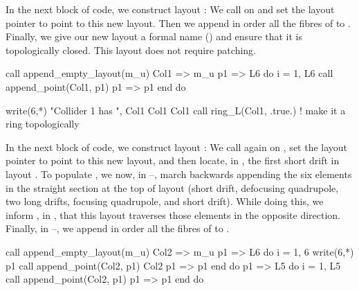 %
In the next block of code, we construct layout : We
call  on  and set the layout
pointer  to point to this new layout. Then we append
in order all the fibres of  to . Finally, we
give our new layout a formal name () and ensure
that it is topologically closed. This layout does not require
patching.
%
\begin{ptccode}
call append_empty_layout(m_u)
Col1 => m_u%
p1 => L6%
do i = 1, L6%
  call append_point(Col1, p1)
  p1 => p1%
end do

write(6,*) "Collider 1 has ", Col1%
Col1%
Col1%
call ring_L(Col1, .true.) ! make it a ring topologically
\end{ptccode}

In the next block of code, we construct layout : We call
 again on , set the layout
pointer  to point to this new layout, and then locate,
in , the first short drift in layout .
To populate , we now, in
--, march backwards
appending the six elements in the straight section at the top of
layout  (short drift, defocusing quadrupole, two long drifts,
focusing quadrupole, and short drift). While doing this, we inform
\PTC, in , that this layout traverses those
elements in the opposite direction. Finally, in
--, we append in order all
the fibres of  to .
%
\begin{ptccode}
call append_empty_layout(m_u)
Col2 => m_u%
p1 => L6%
do i = 1, 6                 \label{lin:col2.bapp.str}
  write(6,*) p1%
  call append_point(Col2, p1)
  Col2%
  p1 => p1%
end do                      \label{lin:col2.eapp.str}
p1 => L5%
do i = 1, L5%
  call append_point(Col2, p1)
  p1 => p1%
end do                      \label{lin:col2.eapp.L5}
\end{ptccode}

